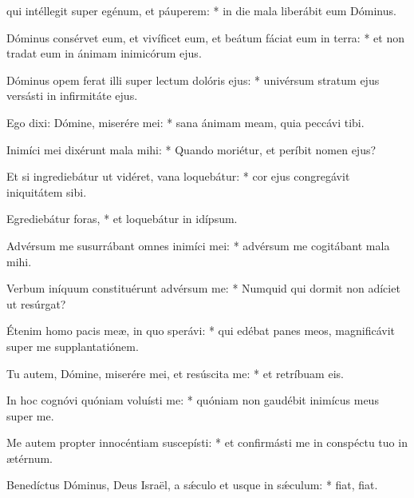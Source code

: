 \begin{psalmus}
    
      qui intéllegit super egénum, et páuperem: * in die mala liberábit eum Dóminus.
		 
		 Dóminus consérvet eum, et vivíficet eum, et beátum fáciat eum in terra: * et non tradat eum in ánimam inimicórum ejus.
		 
		 Dóminus opem ferat illi super lectum dolóris ejus: * univérsum stratum ejus versásti in infirmitáte ejus.
		 
		 Ego dixi: Dómine, miserére mei: * sana ánimam meam, quia peccávi tibi.
		 
		 Inimíci mei dixérunt mala mihi: * Quando moriétur, et períbit nomen ejus?
		 
		 Et si ingrediebátur ut vidéret, vana loquebátur: * cor ejus congregávit iniquitátem sibi.
		 
		 Egrediebátur foras, * et loquebátur in idípsum.
		 
		 Advérsum me susurrábant omnes inimíci mei: * advérsum me cogitábant mala mihi.
		 
		 Verbum iníquum constituérunt advérsum me: * Numquid qui dormit non adíciet ut resúrgat?
		 
		 Étenim homo pacis meæ, in quo sperávi: * qui edébat panes meos, magnificávit super me supplantatiónem.
		 
		 Tu autem, Dómine, miserére mei, et resúscita me: * et retríbuam eis.
		 
		 In hoc cognóvi quóniam voluísti me: * quóniam non gaudébit inimícus meus super me.
		 
		 Me autem propter innocéntiam suscepísti: * et confirmásti me in conspéctu tuo in ætérnum.
		 
		 Benedíctus Dóminus, Deus Israël, a sǽculo et usque in sǽculum: * fiat, fiat.

    \end{psalmus}
